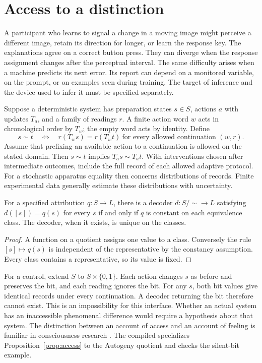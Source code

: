 \section{Access to a distinction}
A participant who learns to signal a change in a moving image might perceive a different image, retain its direction for longer, or learn the response key. The explanations agree on a correct button press. They can diverge when the response assignment changes after the perceptual interval. The same difficulty arises when a machine predicts its next error. Its report can depend on a monitored variable, on the prompt, or on examples seen during training. The target of inference and the device used to infer it must be specified separately.

Suppose a deterministic system has preparation states $s\in S$, actions $a$ with updates $T_a$, and a family of readings $r$. A finite action word $w$ acts in chronological order by $T_w$; the empty word acts by identity. Define
\begin{equation}
s\sim t\quad\Longleftrightarrow\quad
 r(T_w s)=r(T_w t)\ \text{for every allowed continuation }(w,r).
\label{eq:indist}
\end{equation}
Assume that prefixing an available action to a continuation is allowed on the stated domain. Then $s\sim t$ implies $T_a s\sim T_a t$. With interventions chosen after intermediate outcomes, include the full record of each allowed adaptive protocol. For a stochastic apparatus equality then concerns distributions of records. Finite experimental data generally estimate these distributions with uncertainty.

\begin{proposition}\label{prop:access}
For a specified attribution $q:S\to L$, there is a decoder $d:S/{\sim}\to L$ satisfying $d([s])=q(s)$ for every $s$ if and only if $q$ is constant on each equivalence class. The decoder, when it exists, is unique on the classes.
\end{proposition}
\begin{proof}
A function on a quotient assigns one value to a class. Conversely the rule $[s]\mapsto q(s)$ is independent of the representative by the constancy assumption. Every class contains a representative, so its value is fixed.
\end{proof}

For a control, extend $S$ to $S\times\{0,1\}$. Each action changes $s$ as before and preserves the bit, and each reading ignores the bit. For any $s$, both bit values give identical records under every continuation. A decoder returning the bit therefore cannot exist. This is an impossibility for this interface. Whether an actual system has an inaccessible phenomenal difference would require a hypothesis about that system. The distinction between an account of access and an account of feeling is familiar in consciousness research \citep{chalmers1995}. The compiled  specializes Proposition~\ref{prop:access} to the Autogeny quotient and checks the silent-bit example.

